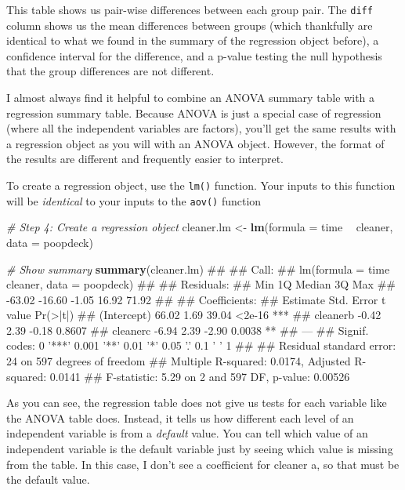 \documentclass[]{book}
\newenvironment{Shaded}{\begin{snugshade}}{\end{snugshade}}
\newcommand{\KeywordTok}[1]{\textcolor[rgb]{0.13,0.29,0.53}{\textbf{#1}}}
\newcommand{\DataTypeTok}[1]{\textcolor[rgb]{0.13,0.29,0.53}{#1}}
\newcommand{\StringTok}[1]{\textcolor[rgb]{0.31,0.60,0.02}{#1}}
\newcommand{\CommentTok}[1]{\textcolor[rgb]{0.56,0.35,0.01}{\textit{#1}}}
\newcommand{\OperatorTok}[1]{\textcolor[rgb]{0.81,0.36,0.00}{\textbf{#1}}}
\newcommand{\NormalTok}[1]{#1}
\theoremstyle{definition}
\theoremstyle{definition}
\theoremstyle{remark}
\begin{document}
This table shows us pair-wise differences between each group pair. The
\texttt{diff} column shows us the mean differences between groups (which
thankfully are identical to what we found in the summary of the
regression object before), a confidence interval for the difference, and
a p-value testing the null hypothesis that the group differences are not
different.

I almost always find it helpful to combine an ANOVA summary table with a
regression summary table. Because ANOVA is just a special case of
regression (where all the independent variables are factors), you'll get
the same results with a regression object as you will with an ANOVA
object. However, the format of the results are different and frequently
easier to interpret.

To create a regression object, use the \texttt{lm()} function. Your
inputs to this function will be \emph{identical} to your inputs to the
\texttt{aov()} function

\begin{Shaded}
\begin{Highlighting}[]
\CommentTok{# Step 4: Create a regression object}
\NormalTok{cleaner.lm <-}\StringTok{ }\KeywordTok{lm}\NormalTok{(}\DataTypeTok{formula =}\NormalTok{ time }\OperatorTok{~}\StringTok{ }\NormalTok{cleaner,}
                 \DataTypeTok{data =}\NormalTok{ poopdeck)}

\CommentTok{# Show summary}
\KeywordTok{summary}\NormalTok{(cleaner.lm)}
\NormalTok{## }
\NormalTok{## Call:}
\NormalTok{## lm(formula = time ~ cleaner, data = poopdeck)}
\NormalTok{## }
\NormalTok{## Residuals:}
\NormalTok{##    Min     1Q Median     3Q    Max }
\NormalTok{## -63.02 -16.60  -1.05  16.92  71.92 }
\NormalTok{## }
\NormalTok{## Coefficients:}
\NormalTok{##             Estimate Std. Error t value Pr(>|t|)    }
\NormalTok{## (Intercept)    66.02       1.69   39.04   <2e-16 ***}
\NormalTok{## cleanerb       -0.42       2.39   -0.18   0.8607    }
\NormalTok{## cleanerc       -6.94       2.39   -2.90   0.0038 ** }
\NormalTok{## ---}
\NormalTok{## Signif. codes:  0 '***' 0.001 '**' 0.01 '*' 0.05 '.' 0.1 ' ' 1}
\NormalTok{## }
\NormalTok{## Residual standard error: 24 on 597 degrees of freedom}
\NormalTok{## Multiple R-squared:  0.0174, Adjusted R-squared:  0.0141 }
\NormalTok{## F-statistic: 5.29 on 2 and 597 DF,  p-value: 0.00526}
\end{Highlighting}
\end{Shaded}

As you can see, the regression table does not give us tests for each
variable like the ANOVA table does. Instead, it tells us how different
each level of an independent variable is from a \emph{default} value.
You can tell which value of an independent variable is the default
variable just by seeing which value is missing from the table. In this
case, I don't see a coefficient for cleaner a, so that must be the
default value.
\end{document}
